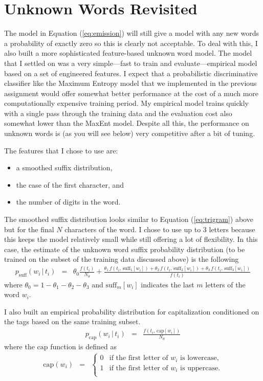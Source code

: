 \documentclass[11pt]{article}
\newcommand{\eq}[1]{Equation (\ref{eq:#1})}
\begin{document}
\section{Unknown Words Revisited}

The model in \eq{emission} will still give a model with any new words a
probability of exactly zero so this is clearly not acceptable.
To deal with this, I also built a more sophisticated feature-based unknown
word model.
The model that I settled on was a very simple---fast to train and
evaluate---empirical model based on a set of engineered features.
I expect that a probabilistic discriminative classifier like the Maximum
Entropy model that we implemented in the previous assignment would offer
somewhat better performance at the cost of a much more computationally
expensive training period.
My empirical model trains quickly with a single pass through the training data
and the evaluation cost also somewhat lower than the MaxEnt model.
Despite all this, the performance on unknown words is (as you will see below)
very competitive after a bit of tuning.

The features that I chose to use are:
\begin{itemize}
\item{a smoothed suffix distribution,}
\item{the case of the first character, and}
\item{the number of digits in the word.}
\end{itemize}

The smoothed suffix distribution looks similar to \eq{trigram} above but for
the final $N$ characters of the word.
I chose to use up to 3 letters because this keeps the model relatively small
while still offering a lot of flexibility.
In this case, the estimate of the unknown word suffix probability
distribution (to be trained on the subset of the training data discussed
above) is the following
\begin{eqnarray}
p_\mathrm{suff}(w_i\,|\,t_i) &=& \theta_0\frac{f(t_i)}{N_\theta} +
    \frac{\theta_1\,f(t_i,\,\mathrm{suff}_1[w_i])
          + \theta_2\,f(t_i,\,\mathrm{suff}_2[w_i])
          + \theta_3\,f(t_i,\,\mathrm{suff}_3[w_i])}{f(t_i)}
\end{eqnarray}
where $\theta_0 = 1 - \theta_1 - \theta_2 - \theta_3$ and
$\mathrm{suff}_m[w_i]$ indicates the last $m$ letters of the word $w_i$.

I also built an empirical probability distribution for capitalization
conditioned on the tags based on the same training subset.
\begin{eqnarray}
p_\mathrm{cap} (w_i\,|\,t_i) &=&
    \frac{f(t_i,\,\mathrm{cap}[w_i])}{N_\theta}
\end{eqnarray}
where the $\mathrm{cap}$ function is defined as
\begin{eqnarray}
\mathrm{cap}(w_i) &=& \left \{ \begin{array}{ll}
    0 & \mbox{if the first letter of $w_i$ is lowercase,} \\
    1 & \mbox{if the first letter of $w_i$ is uppercase.} \\
\end{array}\right .
\end{eqnarray}
\end{document}
